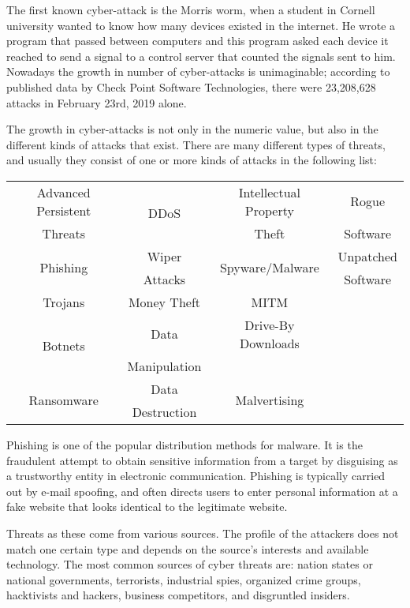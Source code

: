 \documentclass{article}
\begin{document}
\indent The first known cyber-attack is the Morris worm, when a student in Cornell university wanted to know how many devices existed in the internet. He wrote a program that passed between computers and this program asked each device it reached to send a signal to a control server that counted the signals sent to him. Nowadays the growth in number of cyber-attacks is unimaginable; according to published data by Check Point Software Technologies, there were 23,208,628 attacks in February 23rd, 2019 alone.

\indent The growth in cyber-attacks is not only in the numeric value, but also in the different kinds of attacks that exist. There are many different types of threats, and usually they consist of one or more kinds of attacks in the following list:

\begin{table}[htb]
\centering
\begin{tabular}[c]{|c|c|c|c|}
\hline
Advanced Persistent & \multirow{ 2}{*}{DDoS} & Intellectual Property & Rogue \\
Threats & & Theft & Software\\
\hline
\multirow{ 2}{*}{Phishing} & Wiper & \multirow{ 2}{*}{Spyware/Malware} & Unpatched \\
 & Attacks & & Software \\
\hline
Trojans & Money Theft & MITM &  \\
\hline
\multirow{ 2}{*}{Botnets} & Data & Drive-By Downloads &  \\
 & Manipulation & & \\
\hline
\multirow{ 2}{*}{Ransomware} & Data & \multirow{ 2}{*}{Malvertising} &  \\
 & Destruction & & \\ 
\hline
\end{tabular}
\end{table}


\indent Phishing is one of the popular distribution methods for malware. It is the fraudulent attempt to obtain sensitive information from a target by disguising as a trustworthy entity in electronic communication. Phishing is typically carried out by e-mail spoofing, and often directs users to enter personal information at a fake website that looks identical to the legitimate website.

\indent Threats as these come from various sources. The profile of the attackers does not match one certain type and depends on the source’s interests and available technology. The most common sources of cyber threats are: nation states or national governments, terrorists, industrial spies, organized crime groups, hacktivists and hackers, business competitors, and disgruntled insiders.
\end{document}
